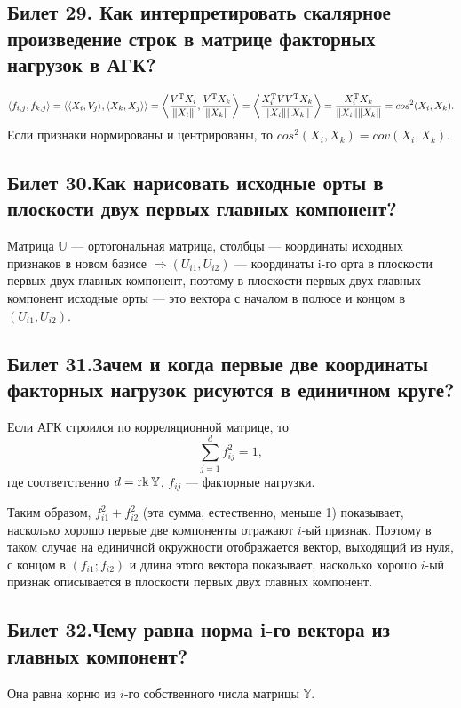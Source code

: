 \subsection{Билет 29. Как интерпретировать скалярное произведение строк в матрице факторных нагрузок в АГК?}
\begin{equation*}
\langle f_{i,j},f_{k,j} \rangle =
\langle \langle X_i,V_j\rangle,\langle X_k,X_j \rangle \rangle = 
\left\langle \frac{V^{\operatorname*{T}} X_i}{\Vert X_i\Vert}, \frac{V^{\operatorname*{T}} X_k}{\Vert X_k \Vert}\right\rangle =
\left\langle \frac{X_i^{\operatorname*{T}} V V^{\operatorname*{T}}X_k } {\Vert X_i\Vert \Vert X_k \Vert}\right\rangle = 
\frac{X_i^{\operatorname*{T}} X_k}{\Vert X_i\Vert \Vert X_k \Vert}=cos^2(X_i,X_k) .
\end{equation*}
Если признаки нормированы и центрированы, то $cos^2(X_i,X_k)=cov(X_i,X_k)$.

\subsection{Билет 30.Как нарисовать исходные орты в плоскости двух первых главных компонент?}  
Матрица $\mathbb{U}$ --- ортогональная матрица, столбцы --- координаты исходных признаков в новом базисе $\Rightarrow (U_{i1},U_{i2})$ --- координаты i-го орта в плоскости первых двух главных компонент, поэтому в плоскости первых двух главных компонент исходные орты --- это вектора с началом в полюсе и концом в $(U_{i1},U_{i2})$. 

\subsection{Билет 31.Зачем и когда первые две координаты факторных нагрузок рисуются в единичном круге?}
Если АГК строился по корреляционной матрице, то 
\begin{equation}
\sum\limits_{j = 1}^{d} f^2_{ij} = 1, 
\end{equation}
где соответственно $d = \operatorname{rk} \mathbb{Y}$, $f_{ij}$ --- факторные нагрузки.

Таким образом, $f^2_{i1} + f^2_{i2}$ (эта сумма, естественно, меньше 1) показывает, насколько хорошо первые две компоненты отражают $i$-ый признак.
Поэтому в таком случае на единичной окружности отображается вектор, выходящий из нуля, с концом в $(f_{i1};f_{i2})$ и длина этого вектора показывает, насколько хорошо $i$-ый признак описывается в плоскости первых двух главных компонент.

\subsection{Билет 32.Чему равна норма i-го вектора из главных компонент?}
Она равна корню из $i$-го собственного числа матрицы $\mathbb{Y}$.

